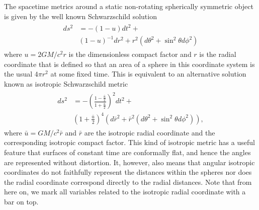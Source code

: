 \documentclass[iop, usenatbib]{emulateapj}
\newcommand{\sch}{Schwarzschild }
\newcommand{\rb}{\ensuremath{\bar{r}}}
\renewcommand{\ub}{\ensuremath{\bar{u}}}
\begin{document}
The spacetime metrics around a static non-rotating spherically symmetric object is given by the well known \sch solution
\begin{align}\begin{split}
ds^2 & = -(1-u)dt^2 + \\
     & (1-u)^{-1}dr^2+r^2(d\theta^2+\sin^2\theta d\phi^2)
\end{split}\end{align}
where $u = 2GM/c^2 r$ is the dimensionless compact factor and $r$ is the radial coordinate that is defined so that an area of a sphere in this coordinate system is the usual $4\pi r^2$ at some fixed time.
This is equivalent to an alternative solution known as isotropic \sch metric \citep[see for e.g.][]{MTW73}
\begin{align}\begin{split}
\label{eq:ISch}
ds^2 & = -\left( \frac{1-\frac{\ub}{2}}{1+\frac{\ub}{2}} \right)^2 dt^2 + \\
     & (1+\frac{\ub}{2})^4(d\rb^2 + \rb^2(d\theta^2+\sin^2\theta d\phi^2)),
\end{split}\end{align}
where $\ub=GM/c^2\rb$ and $\rb$ are the isotropic radial coordinate and the corresponding isotropic compact factor. 
This kind of isotropic metric has a useful feature that surfaces of constant time are conformally flat, and hence the angles are represented without distortion.
It, however, also means that angular isotropic coordinates do not faithfully represent the distances within the spheres nor does the radial coordinate correspond directly to the radial distances.
Note that from here on, we mark all variables related to the isotropic radial coordinate with a bar on top.
\end{document}
